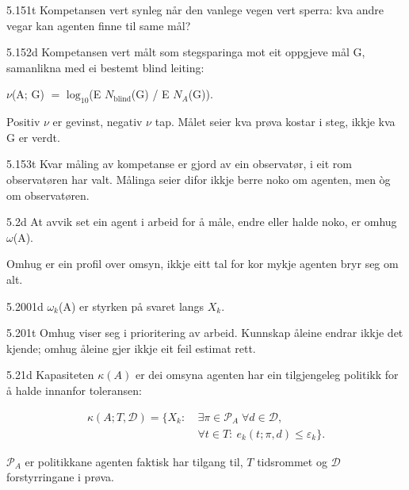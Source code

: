 \begin{formproposition}{5.151}{t}
Kompetansen vert synleg når den vanlege vegen vert sperra: kva andre vegar kan agenten finne til same mål?
\end{formproposition}

\begin{formproposition}{5.152}{d}
Kompetansen vert målt som stegsparinga mot eit oppgjeve mål G, samanlikna med ei bestemt blind leiting:

\(ν\)(A; G) \(=\) \(\mathrm{log}_{10}\)(E \(N_{\mathrm{blind}}\)(G) / E \(N_{A}\)(G)).

Positiv \(ν\) er gevinst, negativ \(ν\) tap. Målet seier kva prøva kostar i steg, ikkje kva G er verdt.
\end{formproposition}

\begin{formproposition}{5.153}{t}
Kvar måling av kompetanse er gjord av ein observatør, i eit rom observatøren har valt. Målinga seier difor ikkje berre noko om agenten, men òg om observatøren.
\end{formproposition}

\begin{formproposition}{5.2}{d}
At avvik set ein agent i arbeid for å måle, endre eller halde noko, er omhug \(ω\)(A).

Omhug er ein profil over omsyn, ikkje eitt tal for kor mykje agenten bryr seg om alt.
\end{formproposition}

\begin{formproposition}{5.2001}{d}
\(ω_{k}\)(A) er styrken på svaret langs \(X_{k}\).
\end{formproposition}

\begin{formproposition}{5.201}{t}
Omhug viser seg i prioritering av arbeid. Kunnskap åleine endrar ikkje det kjende; omhug åleine gjer ikkje eit feil estimat rett.
\end{formproposition}

\begin{formproposition}{5.21}{d}
Kapasiteten \(\kappa(A)\) er dei omsyna agenten har ein tilgjengeleg politikk for å halde innanfor toleransen:

\[
\begin{aligned}
\kappa(A;T,\mathcal D)=\{X_k:\ &\exists\pi\in\mathcal P_A\;\forall d\in\mathcal D,\\
&\forall t\in T:\ e_k(t;\pi,d)\leq\varepsilon_k\}.
\end{aligned}
\]

\(\mathcal P_A\) er politikkane agenten faktisk har tilgang til, \(T\) tidsrommet og \(\mathcal D\) forstyrringane i prøva.
\end{formproposition}

